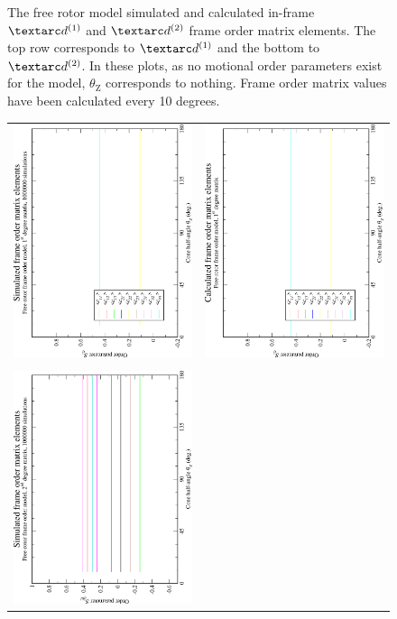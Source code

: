 \begin{figure}
\begin{tabular}{@{}cc@{}}
  \end{tabular}
  \caption[Free rotor simulated and calculated in-frame $\FOone$ and $\FOtwo$ elements.]{
    The free rotor model simulated and calculated in-frame $\FOone$ and $\FOtwo$ frame order matrix elements.
    The top row corresponds to $\FOone$ and the bottom to $\FOtwo$.
    In these plots, as no motional order parameters exist for the model, $\theta_\textrm{Z}$ corresponds to nothing.
    Frame order matrix values have been calculated every 10 degrees.
  }
  \label{fig: simulated and calculated in-frame 1st and 2nd degree free rotor frame order}
\end{figure}

\begin{figure}
\centering
  \begin{tabular}{@{}cc@{}}
    \includegraphics[width=.35\textwidth,angle=270]{images/frame_order_matrix/Sij_free_rotor_out_of_frame_theta_z_ens1000000.eps} &
    \includegraphics[width=.35\textwidth,angle=270]{images/frame_order_matrix/Sij_free_rotor_out_of_frame_theta_z_calc.eps} \\
    \\[-5pt]
    \includegraphics[width=.35\textwidth,angle=270]{images/frame_order_matrix/Sijkl_free_rotor_out_of_frame_theta_z_ens1000000.eps} &

\end{tabular}
\end{figure}
